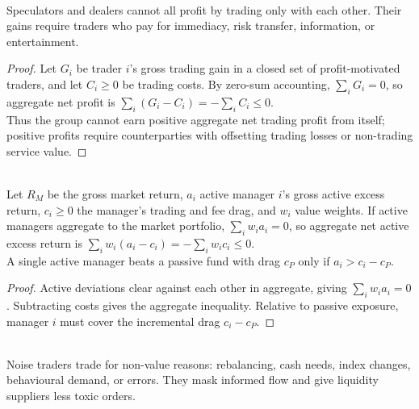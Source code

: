 \documentclass[a4paper,oneside,openany]{book}
\begin{document}
\begin{corollary} \\
Speculators and dealers cannot all profit by trading only with each other. Their gains require traders who pay for immediacy, risk transfer, information, or entertainment.
\begin{proof}
Let $G_i$ be trader $i$'s gross trading gain in a closed set of profit-motivated traders, and let $C_i\ge0$ be trading costs. By zero-sum accounting, $\sum_i G_i=0$, so aggregate net profit is $\sum_i (G_i-C_i)=-\sum_i C_i\le0$.\\
Thus the group cannot earn positive aggregate net trading profit from itself; positive profits require counterparties with offsetting trading losses or non-trading service value.
\end{proof}
\end{corollary}

\begin{corollary} \\
Let $R_M$ be the gross market return, $a_i$ active manager $i$'s gross active excess return, $c_i\ge0$ the manager's trading and fee drag, and $w_i$ value weights. If active managers aggregate to the market portfolio, $\sum_i w_i a_i=0$, so aggregate net active excess return is $\sum_i w_i(a_i-c_i)=-\sum_i w_i c_i\le0$.\\
A single active manager beats a passive fund with drag $c_P$ only if $a_i>c_i-c_P$.
\begin{proof}
Active deviations clear against each other in aggregate, giving $\sum_i w_i a_i=0$. Subtracting costs gives the aggregate inequality. Relative to passive exposure, manager $i$ must cover the incremental drag $c_i-c_P$.
\end{proof}
\end{corollary}

\begin{definition} \\
Noise traders trade for non-value reasons: rebalancing, cash needs, index changes, behavioural demand, or errors. They mask informed flow and give liquidity suppliers less toxic orders.
\end{definition}
\end{document}
